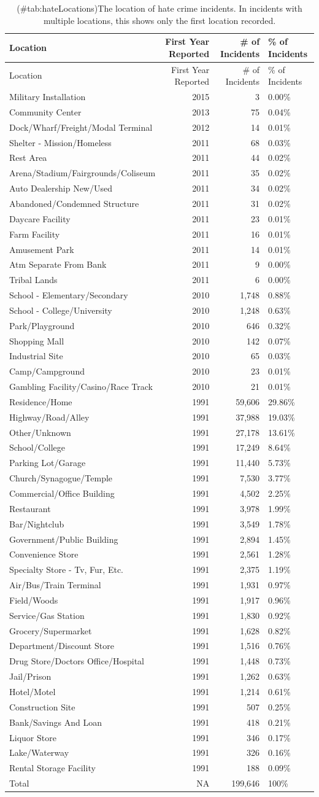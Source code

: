 \documentclass[
  12pt,
  openany]{book}
\begin{document}
\begin{longtable}[]{@{}lrrl@{}}
\caption{(\#tab:hateLocations)The location of hate crime incidents. In incidents with multiple locations, this shows only the first location recorded.}\tabularnewline
\toprule
Location & First Year Reported & \# of Incidents & \% of Incidents\tabularnewline
\midrule
\endfirsthead
\toprule
Location & First Year Reported & \# of Incidents & \% of Incidents\tabularnewline
\midrule
\endhead
Military Installation & 2015 & 3 & 0.00\%\tabularnewline
Community Center & 2013 & 75 & 0.04\%\tabularnewline
Dock/Wharf/Freight/Modal Terminal & 2012 & 14 & 0.01\%\tabularnewline
Shelter - Mission/Homeless & 2011 & 68 & 0.03\%\tabularnewline
Rest Area & 2011 & 44 & 0.02\%\tabularnewline
Arena/Stadium/Fairgrounds/Coliseum & 2011 & 35 & 0.02\%\tabularnewline
Auto Dealership New/Used & 2011 & 34 & 0.02\%\tabularnewline
Abandoned/Condemned Structure & 2011 & 31 & 0.02\%\tabularnewline
Daycare Facility & 2011 & 23 & 0.01\%\tabularnewline
Farm Facility & 2011 & 16 & 0.01\%\tabularnewline
Amusement Park & 2011 & 14 & 0.01\%\tabularnewline
Atm Separate From Bank & 2011 & 9 & 0.00\%\tabularnewline
Tribal Lands & 2011 & 6 & 0.00\%\tabularnewline
School - Elementary/Secondary & 2010 & 1,748 & 0.88\%\tabularnewline
School - College/University & 2010 & 1,248 & 0.63\%\tabularnewline
Park/Playground & 2010 & 646 & 0.32\%\tabularnewline
Shopping Mall & 2010 & 142 & 0.07\%\tabularnewline
Industrial Site & 2010 & 65 & 0.03\%\tabularnewline
Camp/Campground & 2010 & 23 & 0.01\%\tabularnewline
Gambling Facility/Casino/Race Track & 2010 & 21 & 0.01\%\tabularnewline
Residence/Home & 1991 & 59,606 & 29.86\%\tabularnewline
Highway/Road/Alley & 1991 & 37,988 & 19.03\%\tabularnewline
Other/Unknown & 1991 & 27,178 & 13.61\%\tabularnewline
School/College & 1991 & 17,249 & 8.64\%\tabularnewline
Parking Lot/Garage & 1991 & 11,440 & 5.73\%\tabularnewline
Church/Synagogue/Temple & 1991 & 7,530 & 3.77\%\tabularnewline
Commercial/Office Building & 1991 & 4,502 & 2.25\%\tabularnewline
Restaurant & 1991 & 3,978 & 1.99\%\tabularnewline
Bar/Nightclub & 1991 & 3,549 & 1.78\%\tabularnewline
Government/Public Building & 1991 & 2,894 & 1.45\%\tabularnewline
Convenience Store & 1991 & 2,561 & 1.28\%\tabularnewline
Specialty Store - Tv, Fur, Etc. & 1991 & 2,375 & 1.19\%\tabularnewline
Air/Bus/Train Terminal & 1991 & 1,931 & 0.97\%\tabularnewline
Field/Woods & 1991 & 1,917 & 0.96\%\tabularnewline
Service/Gas Station & 1991 & 1,830 & 0.92\%\tabularnewline
Grocery/Supermarket & 1991 & 1,628 & 0.82\%\tabularnewline
Department/Discount Store & 1991 & 1,516 & 0.76\%\tabularnewline
Drug Store/Doctors Office/Hospital & 1991 & 1,448 & 0.73\%\tabularnewline
Jail/Prison & 1991 & 1,262 & 0.63\%\tabularnewline
Hotel/Motel & 1991 & 1,214 & 0.61\%\tabularnewline
Construction Site & 1991 & 507 & 0.25\%\tabularnewline
Bank/Savings And Loan & 1991 & 418 & 0.21\%\tabularnewline
Liquor Store & 1991 & 346 & 0.17\%\tabularnewline
Lake/Waterway & 1991 & 326 & 0.16\%\tabularnewline
Rental Storage Facility & 1991 & 188 & 0.09\%\tabularnewline
Total & NA & 199,646 & 100\%\tabularnewline
\bottomrule
\end{longtable}
\end{document}
